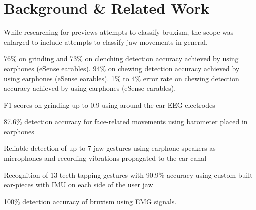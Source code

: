 \chapter{Background \& Related Work}
\label{ch:Background}

While researching for previews attempts to classify bruxism, the scope was enlarged to include attempts to classify jaw movements in general.

76\% on grinding and 73\% on clenching detection accuracy achieved by \cite{bondareva2021earables} using earphones (eSense earables). 
94\% on chewing detection accuracy achieved by \cite{lotfi2020comparison} using earphones (eSense earables).
1\% to 4\% error rate on chewing detection accuracy achieved by \cite{lotfi2020comparison} using earphones (eSense earables).


 F1-scores on grinding up to 0.9 using around-the-ear EEG electrodes \cite{Knierim2021}
 
 87.6\% detection accuracy for face-related movements using barometer placed in earphones \cite{Ando2017}
 
 Reliable detection of up to 7 jaw-gestures using earphone speakers as microphones and recording vibrations propagated to the ear-canal \cite{Prakash2020}
 
 Recognition of 13 teeth tapping gestures with 90.9\% accuracy using custom-built ear-pieces with IMU on each side of the user jaw \cite{Sun2021}
 
 100\% detection accuracy of bruxism using EMG signals. \cite{Sonmezocak2021}
 
 